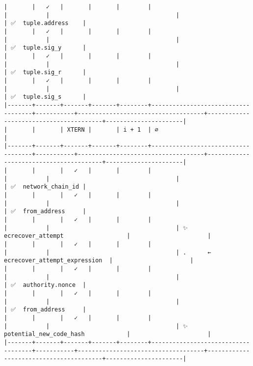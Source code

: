 \documentclass[varwidth=\maxdimen,margin=0.5cm,multi={verbatim}]{standalone}
\begin{document}
\begin{verbatim}
|       |   ✓   |       |       |        |                                    |           |                                    |                                        | ✅  tuple.address    |
|       |   ✓   |       |       |        |                                    |           |                                    |                                        | ✅  tuple.sig_y      |
|       |   ✓   |       |       |        |                                    |           |                                    |                                        | ✅  tuple.sig_r      |
|       |   ✓   |       |       |        |                                    |           |                                    |                                        | ✅  tuple.sig_s      |
|-------+-------+-------+-------+--------+------------------------------------+-----------+------------------------------------+----------------------------------------+----------------------|
|       |       | XTERN |       | i + 1  | ∅                                  |
|-------+-------+-------+-------+--------+------------------------------------+-----------+------------------------------------+----------------------------------------+----------------------|
|       |       |   ✓   |       |        |                                    |           |                                    |                                        | ✅  network_chain_id |
|       |       |   ✓   |       |        |                                    |           |                                    |                                        | ✅  from_address     |
|       |       |   ✓   |       |        |                                    |           |                                    | ✨  ecrecover_attempt                  |                      |
|       |       |   ✓   |       |        |                                    |           |                                    | .      ← ecrecover_attempt_expression  |                      |
|       |       |   ✓   |       |        |                                    |           |                                    |                                        | ✅  authority.nonce  |
|       |       |   ✓   |       |        |                                    |           |                                    |                                        | ✅  from_address     |
|       |       |   ✓   |       |        |                                    |           |                                    | ✨  potential_new_code_hash            |                      |
|-------+-------+-------+-------+--------+------------------------------------+-----------+------------------------------------+----------------------------------------+----------------------|

\end{verbatim}
\end{document}
